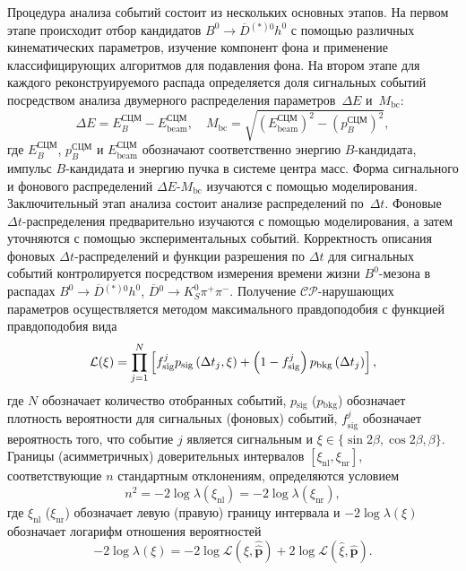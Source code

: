 \documentclass[a4paper,14pt]{extarticle} %
\newcommand{\bn}{\ensuremath{B^0}\xspace}
\newcommand{\hn}{\ensuremath{h^0}\xspace}
\newcommand{\dbar}{\ensuremath{\overline{D}}\xspace}
\newcommand{\dnbar}{\ensuremath{\dbar{}^0}\xspace}
\newcommand{\dstarnbar}{\ensuremath{\dbar{}^{(*)0}}\xspace}
\newcommand{\ks}{\ensuremath{K_S^0}\xspace}
\newcommand{\cms}{\ensuremath{\textrm{СЦМ}}\xspace}
\newcommand{\pphi}{\ensuremath{\beta}\xspace}
\newcommand{\sindbeta}{\ensuremath{\sin{2\pphi}}\xspace}
\newcommand{\cosdbeta}{\ensuremath{\cos{2\pphi}}\xspace}
\newcommand{\lbr}{\ensuremath{\left(}}
\newcommand{\rbr}{\ensuremath{\right)}}
\newcommand{\mbc}{\ensuremath{M_{\mathrm{bc}}}\xspace}
\newcommand{\de}{\ensuremath{\Delta E}\xspace}
\newcommand{\dbkpp}{\ensuremath{\dnbar\to\ks\pi^+\pi^-}\xspace}
\newcommand{\bdsth}{\ensuremath{\bn\to\dstarnbar\hn}\xspace}
\newcommand{\dt}{\ensuremath{\Delta t}\xspace}
\newcommand{\dtj}{\ensuremath{\Delta t_{j}}\xspace}
\newcommand{\vecp}{\ensuremath{\mathbf{p}}\xspace}
\newcommand{\mcl}{\ensuremath{\mathcal{L}}\xspace}
\newcommand{\cpconj}{\ensuremath{\mathcal{CP}}\xspace}
\newcommand{\sig}{\ensuremath{\mathrm{sig}}\xspace}
\newcommand{\bkg}{\ensuremath{\mathrm{bkg}}\xspace}
\newcommand{\subsig}{\ensuremath{{}_{\sig}}\xspace}
\newcommand{\subbkg}{\ensuremath{{}_{\bkg}}\xspace}
\newcommand{\psig}{\ensuremath{p\subsig}\xspace}
\newcommand{\fsigj}{\ensuremath{f^j_{\mathrm{sig}}}\xspace}
\newcommand{\pbkg}{\ensuremath{p\subbkg}\xspace}
\begin{document}
Процедура анализа событий состоит из нескольких основных этапов.  На первом этапе происходит отбор кандидатов \bdsth с помощью различных кинематических параметров, изучение компонент фона и применение классифицирующих алгоритмов для подавления фона.  На втором этапе для каждого реконструируемого распада определяется доля сигнальных событий посредством анализа двумерного распределения параметров~\de и~\mbc:
\begin{equation}
 \de=E_B^{\cms}-E_{\mathrm{beam}}^{\cms},\quad
 \mbc = \sqrt{\left(E^{\cms}_{\mathrm{beam}}\right)^2-\left(p^{\cms}_{B}\right)^2},
\end{equation}
где $E_B^{\cms}$, $p^{\cms}_{B}$ и $E_{\mathrm{beam}}^{\cms}$ обозначают соответственно энергию $B$-кандидата, импульс $B$-кандидата и энергию пучка в системе центра масс.  Форма сигнального и фонового распределений \de-\mbc изучаются с помощью моделирования.  Заключительный этап анализа состоит анализе распределений по~\dt.  Фоновые \dt-распределения предварительно изучаются с помощью моделирования, а затем уточняются с помощью экспериментальных событий.  Корректность описания фоновых \dt-распределений и функции разрешения по \dt для сигнальных событий контролируется посредством измерения времени жизни \bn-мезона в распадах \bdsth, \dbkpp.  Получение \cpconj-нарушающих параметров осуществляется методом максимального правдоподобия с функцией правдоподобия вида
\begin{equation}\label{eq:lh}
 \mcl(\xi) = \prod\limits_{j=1}^{N}\left[\fsigj\psig\lbr\dtj,\xi\rbr+\lbr 1-\fsigj\rbr\pbkg\lbr\dtj\rbr\right],
\end{equation}
где $N$ обозначает количество отобранных событий, $\psig$ ($\pbkg$) обозначает плотность вероятности для сигнальных (фоновых) событий, $\fsigj$ обозначает вероятность того, что событие $j$ является сигнальным и $\xi\in\{\sindbeta, \cosdbeta, \pphi\}$.  Границы (асимметричных) доверительных интервалов $[\xi_{\mathrm{nl}},\xi_{\mathrm{nr}}]$, соответствующие $n$ стандартным отклонениям, определяются условием
\begin{equation}
 n^{2} = -2\log\lambda(\xi_{\mathrm{nl}}) = -2\log\lambda(\xi_{\mathrm{nr}}),
\end{equation}
где $\xi_{\mathrm{nl}}$ ($\xi_{\mathrm{nr}}$) обозначает левую (правую) границу интервала и $-2\log\lambda(\xi)$ обозначает логарифм отношения вероятностей 
\begin{equation}\label{eq:confidence_intervals}
 -2\log\lambda(\xi)=-2\log\mcl(\xi,\hat{\hat{\vecp}}) + 2\log\mcl(\hat{\xi},\hat{\vecp}).
\end{equation}
\end{document}
